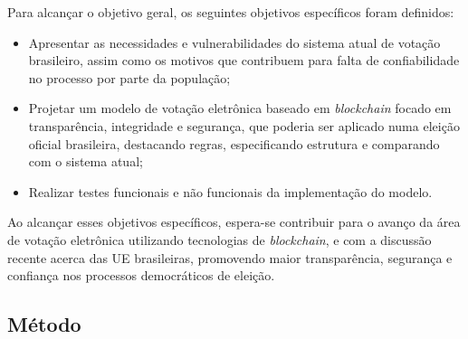 \documentclass[portuguese]{textolivre}
\begin{document}
	Para alcançar o objetivo geral, os seguintes objetivos específicos foram definidos:
	
	\begin{itemize}
		\item Apresentar as necessidades e vulnerabilidades do sistema atual de votação brasileiro, assim como os motivos que contribuem para falta de confiabilidade no processo por parte da população;
		\item Projetar um modelo de votação eletrônica baseado em \emph{blockchain} focado em transparência, integridade e segurança, que poderia ser aplicado numa eleição oficial brasileira, destacando regras, especificando estrutura e comparando com o sistema atual;
		\item Realizar testes funcionais e não funcionais da implementação do modelo.
	\end{itemize}
	
	Ao alcançar esses objetivos específicos, espera-se contribuir para o avanço da área de votação eletrônica utilizando tecnologias de \emph{blockchain}, e com a discussão recente acerca das UE brasileiras,  promovendo maior transparência, segurança e confiança nos processos democráticos de eleição.
	
	\subsection{Método \label{sec-methodology}}
	
\end{document}
